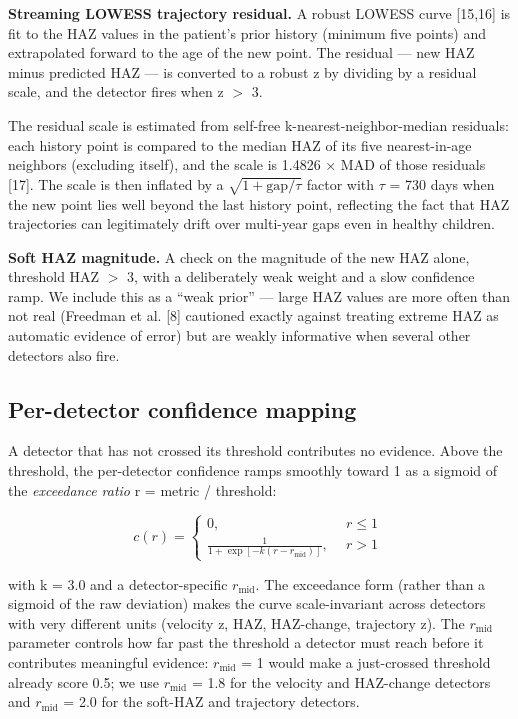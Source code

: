 \documentclass[11pt]{article}
\begin{document}
\textbf{Streaming LOWESS trajectory residual.} A robust LOWESS curve [15,16] is fit to the HAZ values in the patient's prior history (minimum five points) and extrapolated forward to the age of the new point. The residual --- new HAZ minus predicted HAZ --- is converted to a robust z by dividing by a residual scale, and the detector fires when \textbar z\textbar{} \(>\) 3.

The residual scale is estimated from self-free k-nearest-neighbor-median residuals: each history point is compared to the median HAZ of its five nearest-in-age neighbors (excluding itself), and the scale is 1.4826 \(\times\) MAD of those residuals [17]. The scale is then inflated by a \(\sqrt{1 + \mathrm{gap}/\tau}\) factor with \(\tau\) = 730 days when the new point lies well beyond the last history point, reflecting the fact that HAZ trajectories can legitimately drift over multi-year gaps even in healthy children.

\textbf{Soft HAZ magnitude.} A check on the magnitude of the new HAZ alone, threshold \textbar HAZ\textbar{} \(>\) 3, with a deliberately weak weight and a slow confidence ramp. We include this as a ``weak prior'' --- large HAZ values are more often than not real (Freedman et al. [8] cautioned exactly against treating extreme HAZ as automatic evidence of error) but are weakly informative when several other detectors also fire.

\subsection{Per-detector confidence mapping}\label{per-detector-confidence-mapping}

A detector that has not crossed its threshold contributes no evidence. Above the threshold, the per-detector confidence ramps smoothly toward 1 as a sigmoid of the \emph{exceedance ratio} r = \textbar metric\textbar{} / threshold:

\[c(r) = \left\{ \begin{aligned}
0,\ \  & r \leq 1 \\
\frac{1}{1 + \exp[-k(r - r_{\mathrm{mid}})]},\ \  & r > 1
\end{aligned} \right.\ \]

with k = 3.0 and a detector-specific \(r_{\mathrm{mid}}\). The exceedance form (rather than a sigmoid of the raw deviation) makes the curve scale-invariant across detectors with very different units (velocity z, HAZ, HAZ-change, trajectory z). The \(r_{\mathrm{mid}}\) parameter controls how far past the threshold a detector must reach before it contributes meaningful evidence: \(r_{\mathrm{mid}}\) = 1 would make a just-crossed threshold already score 0.5; we use \(r_{\mathrm{mid}}\) = 1.8 for the velocity and HAZ-change detectors and \(r_{\mathrm{mid}}\) = 2.0 for the soft-HAZ and trajectory detectors.
\end{document}
